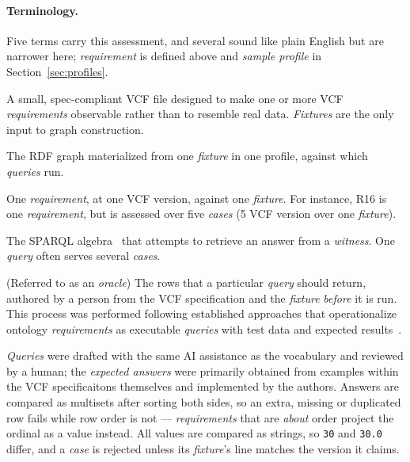 \paragraph{Terminology.}
Five terms carry this assessment, and several sound like plain English but are narrower here; \emph{requirement} is defined above and \emph{sample profile} in Section~\ref{sec:profiles}.

\begin{description}
\setlength{\itemsep}{0pt}\setlength{\parskip}{0pt}
\item[Fixture] A small, spec-compliant VCF file designed to make one or more VCF \emph{requirements} observable rather than to resemble real data. \emph{Fixtures} are the only input to graph construction.
\item[Witness] The RDF graph materialized from one \emph{fixture} in one profile, against which \emph{queries} run.
\item[Case] One \emph{requirement}, at one VCF version, against one \emph{fixture}. For instance, R16 is one \emph{requirement}, but is assessed over five \emph{cases} (5 VCF version over one \emph{fixture}).
\item[Query] The SPARQL algebra~\cite{sparql2013} that attempts to retrieve an answer from a \emph{witness}. One \emph{query} often serves several \emph{cases}.
\item[Expected answer] (Referred to as an \emph{oracle}) The rows that a particular \emph{query} should return, authored by a person from the VCF specification and the \emph{fixture} \emph{before} it is run.
This process was performed following established approaches that operationalize ontology \emph{requirements} as executable \emph{queries} with test data and expected results~\cite{blomqvist2012ontologytesting,wisniewski2019competencyquestions}. 
\end{description}

\emph{Queries} were drafted with the same AI assistance as the vocabulary and reviewed by a human; the \emph{expected answers} were primarily obtained from examples within the VCF specificaitons themselves and implemented by the authors.
Answers are compared as multisets after sorting both sides, so an extra, missing or duplicated row fails while row order is not --- \emph{requirements} that are \emph{about} order project the ordinal as a value instead.
All values are compared as strings, so \texttt{30} and \texttt{30.0} differ, and a \emph{case} is rejected unless its \emph{fixture}'s  line matches the version it claims.

